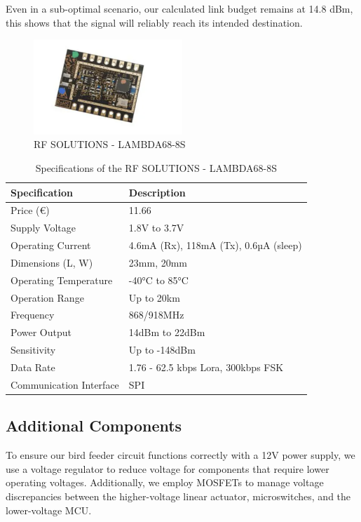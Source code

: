 \documentclass[12pt,a4paper]{article}
\begin{document}
Even in a sub-optimal scenario, our calculated link budget remains at 14.8 dBm, this shows that the signal will reliably reach its intended destination.
\begin{figure}[h]
    \centering
    \includegraphics[width=0.5\textwidth]{images/LoRa.png}
    \caption{RF SOLUTIONS - LAMBDA68-8S \cite{lambda68}}
\end{figure}
\begin{table}[h]
    \centering
    \begin{tabular}{|l|l|}
    \hline
    \textbf{Specification} & \textbf{Description} \\ \hline
    Price (€)              & 11.66                \\ \hline
    Supply Voltage         & 1.8V to 3.7V         \\ \hline
    Operating Current      & 4.6mA (Rx), 118mA (Tx), 0.6µA (sleep) \\ \hline
    Dimensions (L, W)      & 23mm, 20mm           \\ \hline
    Operating Temperature  & -40°C to 85°C        \\ \hline
    Operation Range        & Up to 20km           \\ \hline
    Frequency              & 868/918MHz           \\ \hline
    Power Output           & 14dBm to 22dBm       \\ \hline
    Sensitivity            & Up to -148dBm        \\ \hline
    Data Rate              & 1.76 - 62.5 kbps Lora, 300kbps FSK \\ \hline
    Communication Interface & SPI                 \\ \hline
    \end{tabular}
    \caption{Specifications of the RF SOLUTIONS - LAMBDA68-8S}
    \label{tab:rf_solutions_lambda68_8s}
    \end{table}

\subsection{Additional Components}
To ensure our bird feeder circuit functions correctly with a 12V power supply, we use a voltage regulator to reduce voltage for components that require lower operating voltages. Additionally, we employ MOSFETs to manage voltage discrepancies between the higher-voltage linear actuator, microswitches, and the lower-voltage MCU.
\end{document}
